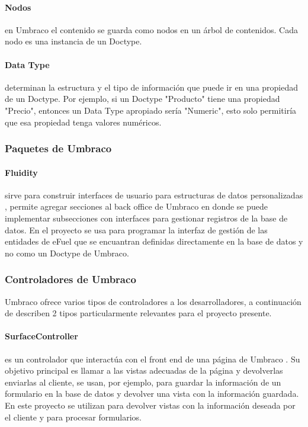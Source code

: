     \paragraph{Nodos} en Umbraco el contenido se guarda como nodos en un árbol de contenidos. Cada nodo es una instancia de un Doctype.
    \paragraph{Data Type} determinan la estructura y el tipo de información que puede ir en una propiedad de un Doctype. Por ejemplo, si un Doctype "Producto" tiene una propiedad "Precio", entonces un Data Type apropiado sería "Numeric", esto solo permitiría que esa propiedad tenga valores numéricos.

    \subsubsection{Paquetes de Umbraco}
    \paragraph{Fluidity} sirve para construir interfaces de usuario para estructuras de datos personalizadas \cite{fluidityDocs}, permite agregar secciones al back office de Umbraco en donde se puede implementar subsecciones con interfaces para gestionar registros de la base de datos. En el proyecto se usa para programar la interfaz de gestión de las entidades de eFuel que se encuantran definidas directamente en la base de datos y no como un Doctype de Umbraco.

    \subsubsection{Controladores de Umbraco}
    Umbraco ofrece varios tipos de controladores a los desarrolladores, a continuación de describen 2 tipos particularmente relevantes para el proyecto presente.
    \paragraph{SurfaceController} es un controlador que interactúa con el front end de una página de Umbraco \cite{surfaceController}. Su objetivo principal es llamar a las vistas adecuadas de la página y devolverlas enviarlas al cliente, se usan, por ejemplo, para guardar la información de un formulario en la base de datos y devolver una vista con la información guardada. En este proyecto se utilizan para devolver vistas con la información deseada por el cliente y para procesar formularios.
